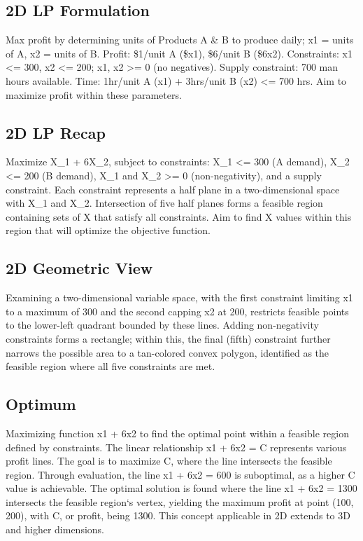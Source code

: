 \subsection*{2D LP Formulation}
Max profit by determining units of Products A \& B to produce daily; x1 = units of A, x2 = units of B\@.
Profit: \$1/unit A (\$x1), \$6/unit B (\$6x2).
Constraints: x1 \textless{}= 300, x2 \textless{}= 200; x1, x2 \textgreater{}= 0 (no negatives).
Supply constraint: 700 man hours available.
Time: 1hr/unit A (x1) + 3hrs/unit B (x2) \textless{}= 700 hrs.
Aim to maximize profit within these parameters.

\subsection*{2D LP Recap}
Maximize X\_1 + 6X\_2, subject to constraints: X\_1 \textless{}= 300 (A demand), X\_2 \textless{}= 200 (B demand), X\_1 and X\_2 \textgreater{}= 0 (non-negativity), and a supply constraint.
Each constraint represents a half plane in a two-dimensional space with X\_1 and X\_2.
Intersection of five half planes forms a feasible region containing sets of X that satisfy all constraints.
Aim to find X values within this region that will optimize the objective function.

\subsection*{2D Geometric View}
Examining a two-dimensional variable space, with the first constraint limiting x1 to a maximum of 300 and the second capping x2 at 200, restricts feasible points to the lower-left quadrant bounded by these lines.
Adding non-negativity constraints forms a rectangle; within this, the final (fifth) constraint further narrows the possible area to a tan-colored convex polygon, identified as the feasible region where all five constraints are met.

\subsection*{Optimum}
Maximizing function x1 + 6x2 to find the optimal point within a feasible region defined by constraints.
The linear relationship x1 + 6x2 = C represents various profit lines.
The goal is to maximize C, where the line intersects the feasible region.
Through evaluation, the line x1 + 6x2 = 600 is suboptimal, as a higher C value is achievable.
The optimal solution is found where the line x1 + 6x2 = 1300 intersects the feasible region`s vertex, yielding the maximum profit at point (100, 200), with C, or profit, being 1300.
This concept applicable in 2D extends to 3D and higher dimensions.

